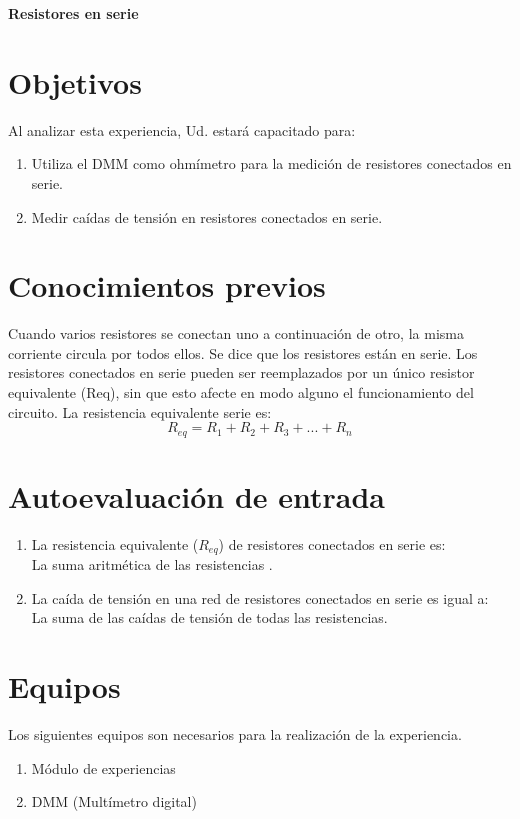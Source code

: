 \thispagestyle{fancy}
\begin{center}
	\LARGE{\textbf{Resistores en serie}}
\end{center}
\section{Objetivos}

Al analizar esta experiencia, Ud. estará capacitado para:
\begin{enumerate}
	\item Utiliza el DMM como ohmímetro para la medición de resistores conectados en
	serie.
	\item Medir caídas de tensión en resistores conectados en serie.
\end{enumerate}
\section{Conocimientos previos}
Cuando varios resistores se conectan uno a continuación de otro, la misma corriente
circula por todos ellos. Se dice que los resistores están en serie.
Los resistores conectados en serie pueden ser reemplazados por un único resistor
equivalente (Req), sin que esto afecte en modo alguno el funcionamiento del circuito.
La resistencia equivalente serie es:
\begin{equation*}
	R_{eq} = R_{1} + R_{2} + R_{3}+ . . . + R_{n}
\end{equation*}
\section{Autoevaluación de entrada}
\begin{enumerate}
	\item La resistencia equivalente ($R_{eq}$) de resistores conectados en serie es:\\
	La suma aritmética de las resistencias .
	\item La caída de tensión en una red de resistores conectados en serie es igual a:\\
	La suma de las caídas de tensión de todas las resistencias.	
\end{enumerate}
\section{Equipos}
Los siguientes equipos son necesarios para la realización de la experiencia. 
\begin{enumerate}
	\item Módulo de experiencias
	\item DMM (Multímetro digital)	
\end{enumerate}
